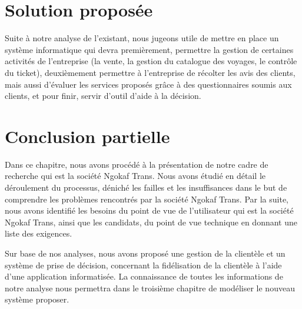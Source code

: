     \section[Solution proposée]{Solution proposée}
    Suite à notre analyse de l’existant, nous jugeons utile de mettre en place un
    système informatique qui devra premièrement, permettre la gestion de certaines activités
    de l’entreprise (la vente, la gestion du catalogue des voyages, le contrôle du ticket), deuxièmement
    permettre à l’entreprise de récolter les avis des clients, mais aussi d’évaluer les
    services proposés grâce à des questionnaires soumis aux clients, et pour finir, servir d’outil d’aide
    à la décision.
    \section[Conclusion partielle]{Conclusion partielle}
    Dans ce chapitre, nous avons procédé à la présentation de notre
    cadre de recherche qui est la société Ngokaf Trans. Nous avons étudié
    en détail le déroulement du processus, déniché les failles et les
    insuffisances dans le but de comprendre les problèmes rencontrés par la
    société Ngokaf Trans. Par la suite, nous avons identifié les besoins du
    point de vue de l’utilisateur qui est la société Ngokaf Trans, ainsi que
    les candidats, du point de vue technique en donnant une liste des exigences.
    \par
    Sur base de nos analyses, nous avons proposé une gestion de la clientèle et
    un système de prise de décision, concernant la fidélisation de la clientèle
    à l’aide d’une application informatisée. La connaissance de toutes les
    informations de notre analyse nous permettra dans le troisième chapitre
    de modéliser le nouveau système proposer.